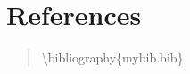 \documentclass[letterpaper]{article} %
\begin{document}
\section{References}
\begin{quote}
\begin{small}
\textbackslash bibliography\{mybib.bib\}
\end{small}
\end{quote}
\end{document}
